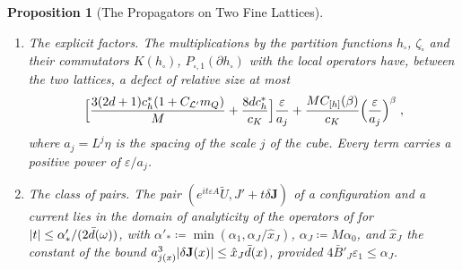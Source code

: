 \documentclass[11pt]{preprint}
\DeclarePairedDelimiter{\abs}{\lvert}{\rvert}
\numberwithin{equation}{section}
\newtheorem{proposition}{Proposition}
\theoremstyle{definition}
\theoremstyle{remark}
\theoremstyle{plain}
\begin{document}
\begin{proposition}[The Propagators on Two Fine Lattices]
\begin{enumerate}[label=(\alph*)]
\begin{equation}
\begin{aligned}
\end{aligned}
\end{equation}
the sums over the bonds $c$ of run~A, with $d_\varepsilon$ the distance in the units of $\varepsilon$ and
\begin{equation}\label{eq:background-size}
    \bar\vartheta(c) \coloneqq \sup_{c'}e^{-\delta'_0d_\varepsilon(c, c')}\vartheta(c')\;,
    \qquad
    \vartheta \coloneqq \varepsilon^2\abs F + \varepsilon^3\abs J\;,
\end{equation}
where $F(p) \coloneqq (\varepsilon/L)^{-2}(U^B(\partial p) - 1)$ and $J$ is the current \cite[(3.11), p.~392]{BalabanPBG} of $U^B$, and $\vartheta \coloneqq 1$ at the collar and outside $Y^\sim$. On the shell $n$ of a local sequence $\bar\vartheta\varepsilon^{-1} \leq 2(L^n\varepsilon)^{-1}$, so that $\chi_B\mathcal L_\iota$ satisfies the hypothesis of Paper, Lemma~\ref{P-lem:shell-reduction}, with the constant $3C_{\mathcal L'}$ and the rate $\delta'_0$ in place of the range of one block.
\item \emph{The explicit factors.} The multiplications by the partition functions $h_\square$, $\zeta_{\tilde\square}$ and their commutators $K(h_\square)$, $P_{\square,1}(\partial h_\square)$ with the local operators have, between the two lattices, a defect of relative size at most
\begin{equation}\label{eq:explicit-factor-defect}
    \Bigl[\frac{3(2d + 1)c^*_h(1 + C_{\mathcal L'}m_Q)}{M} + \frac{8dc^*_h}{c_K}\Bigr]\frac{\varepsilon}{a_j} + \frac{MC_{[h]}(\beta)}{c_K}\Bigl(\frac{\varepsilon}{a_j}\Bigr)^\beta\;,
\end{equation}
where $a_j = L^j\eta$ is the spacing of the scale $j$ of the cube. Every term carries a positive power of $\varepsilon/a_j$.
\item \emph{The class of pairs.} The pair $(e^{it\varepsilon A}\tilde U, J' + t\delta\mathbf J)$ of a configuration and a current lies in the domain of analyticity of the operators of \cite[Sect.~D]{BalabanPBG} for $\abs t \leq \alpha'_*/(2\bar d(\omega))$, with $\alpha'_* \coloneqq \min(\alpha_1, \alpha_J/\hat x_J)$, $\alpha_J \coloneqq M\alpha_0$, and $\hat x_J$ the constant of the bound $a_{j(x)}^3\abs{\delta\mathbf J(x)} \leq \hat x_J\bar d(x)$, provided $4\bar B'_J\varepsilon_1 \leq \alpha_J$.

\end{enumerate}
\end{proposition}
\end{document}
